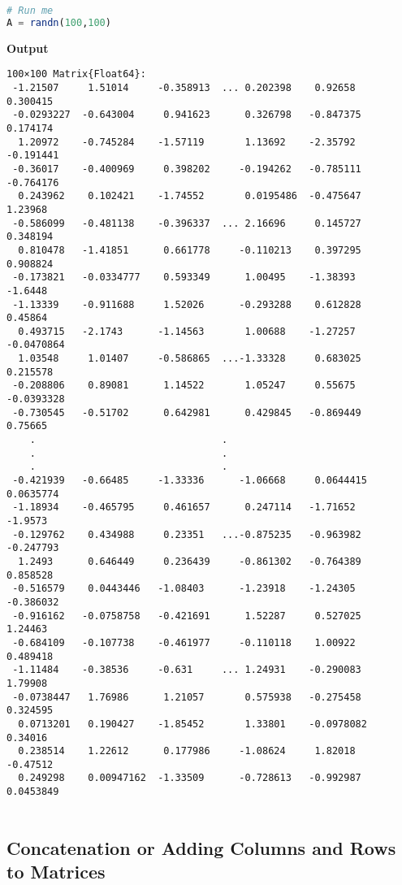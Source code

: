 \begin{lstlisting}[language=Julia,style=mystyle]
# Run me
A = randn(100,100)
\end{lstlisting}
\textbf{Output} 
\begin{verbatim}
100×100 Matrix{Float64}:
 -1.21507     1.51014     -0.358913  ... 0.202398    0.92658     0.300415
 -0.0293227  -0.643004     0.941623      0.326798   -0.847375    0.174174
  1.20972    -0.745284    -1.57119       1.13692    -2.35792    -0.191441
 -0.36017    -0.400969     0.398202     -0.194262   -0.785111   -0.764176
  0.243962    0.102421    -1.74552       0.0195486  -0.475647    1.23968
 -0.586099   -0.481138    -0.396337  ... 2.16696     0.145727    0.348194
  0.810478   -1.41851      0.661778     -0.110213    0.397295    0.908824
 -0.173821   -0.0334777    0.593349      1.00495    -1.38393    -1.6448
 -1.13339    -0.911688     1.52026      -0.293288    0.612828    0.45864
  0.493715   -2.1743      -1.14563       1.00688    -1.27257    -0.0470864
  1.03548     1.01407     -0.586865  ...-1.33328     0.683025    0.215578
 -0.208806    0.89081      1.14522       1.05247     0.55675    -0.0393328
 -0.730545   -0.51702      0.642981      0.429845   -0.869449    0.75665
    .                                .
    .                                .
    .                                .
 -0.421939   -0.66485     -1.33336      -1.06668     0.0644415   0.0635774
 -1.18934    -0.465795     0.461657      0.247114   -1.71652    -1.9573
 -0.129762    0.434988     0.23351   ...-0.875235   -0.963982   -0.247793
  1.2493      0.646449     0.236439     -0.861302   -0.764389    0.858528
 -0.516579    0.0443446   -1.08403      -1.23918    -1.24305    -0.386032
 -0.916162   -0.0758758   -0.421691      1.52287     0.527025    1.24463
 -0.684109   -0.107738    -0.461977     -0.110118    1.00922     0.489418
 -1.11484    -0.38536     -0.631     ... 1.24931    -0.290083    1.79908
 -0.0738447   1.76986      1.21057       0.575938   -0.275458    0.324595
  0.0713201   0.190427    -1.85452       1.33801    -0.0978082   0.34016
  0.238514    1.22612      0.177986     -1.08624     1.82018    -0.47512
  0.249298    0.00947162  -1.33509      -0.728613   -0.992987    0.0453849
  
\end{verbatim}

\subsection{Concatenation or Adding Columns and Rows to Matrices}

